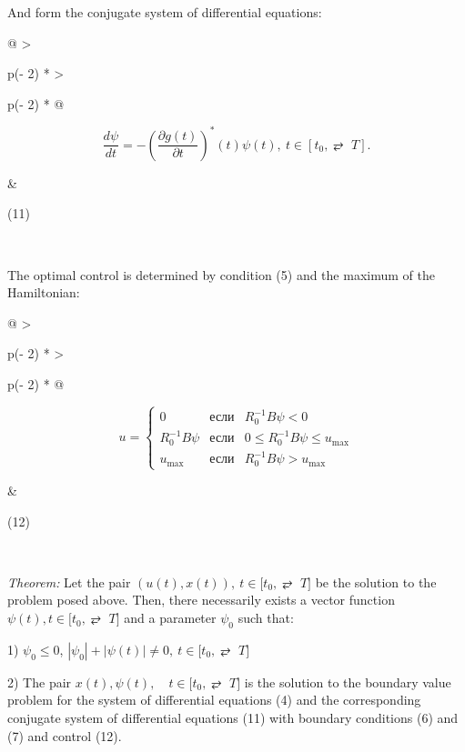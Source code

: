 And form the conjugate system of differential equations:

\begin{longtable}[]{@{}
  >{\raggedright\arraybackslash}p{(\columnwidth - 2\tabcolsep) * }
  >{\raggedright\arraybackslash}p{(\columnwidth - 2\tabcolsep) * }@{}}
\begin{minipage}[b]{\linewidth}\raggedright
\[\frac{d\psi}{dt} = - (\frac{\partial g(t)}{\partial t})^{*}(t)\psi(t),\ t \in \left\lbrack t_{0}, ⥂ \mspace{6mu} T \right\rbrack.\]
\end{minipage} & \begin{minipage}[b]{\linewidth}\raggedright
(11)
\end{minipage} \\
\end{longtable}

The optimal control is determined by condition (5) and the maximum of
the Hamiltonian:

\begin{longtable}[]{@{}
  >{\raggedright\arraybackslash}p{(\columnwidth - 2\tabcolsep) * }
  >{\raggedright\arraybackslash}p{(\columnwidth - 2\tabcolsep) * }@{}}
\begin{minipage}[b]{\linewidth}\raggedright
\[u = \left\{ \begin{matrix}
0 & \text{если} & R_{0}^{-1}B\psi < 0 \\
R_{0}^{-1}B\psi & \text{если} & 0 \leq R_{0}^{-1}B\psi \leq u_{\max} \\
u_{\max} & \text{если} & R_{0}^{-1}B\psi > u_{\max}
\end{matrix} \right.\]
\end{minipage} & \begin{minipage}[b]{\linewidth}\raggedright
(12)
\end{minipage} \\
\end{longtable}


\emph{Theorem:} Let the pair
\(\left( u(t),x(t) \right),\ t \in \lbrack t_{0}, ⥂ \mspace{6mu} T\rbrack\)
be the solution to the problem posed above. Then, there necessarily
exists a vector function
\(\psi(t),t \in \lbrack t_{0}, ⥂ \mspace{6mu} T\rbrack\) and a parameter
$\psi_{0}$ such that:

1) \(\psi_{0} \leq 0\),
\(\left| \psi_{0} \right| + \left| \psi(t) \right| \neq 0,\ t \in \lbrack t_{0}, ⥂ \mspace{6mu} T\rbrack\)

2) The pair
\(x(t),\psi(t),\quad t \in \lbrack t_{0}, ⥂ \mspace{6mu} T\rbrack\) is
the solution to the boundary value problem for the system of
differential equations (4) and the corresponding conjugate system of
differential equations (11) with boundary conditions (6) and (7) and
control (12).

